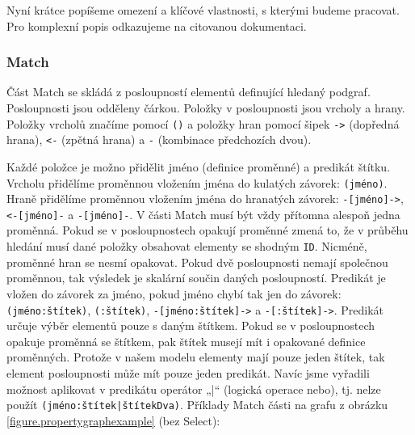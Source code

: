 Nyní krátce popíšeme omezení a klíčové vlastnosti, s kterými budeme pracovat.
Pro komplexní popis odkazujeme na citovanou dokumentaci.

\subsubsection{Match}

Část Match se skládá z posloupností elementů definující hledaný podgraf.
Posloupnosti jsou odděleny čárkou.
Položky v posloupnosti jsou vrcholy a hrany.
Položky vrcholů značíme pomocí \texttt{()} a položky hran pomocí šipek \texttt{->} (dopředná hrana), \texttt{<-} (zpětná hrana) a \texttt{-} (kombinace předchozích dvou).

Každé položce je možno přidělit jméno (definice proměnné) a predikát štítku.
Vrcholu přidělíme proměnnou vložením jména do kulatých závorek: \texttt{(jméno)}.
Hraně přidělíme proměnnou vložením jména do hranatých závorek: \texttt{-[jméno]->}, \texttt{<-[jméno]-} a \texttt{-[jméno]-}.
V části Match musí být vždy přítomna alespoň jedna proměnná.
Pokud se v posloupnostech opakují proměnné zmená to, že v průběhu hledání musí dané položky obsahovat elementy se shodným \texttt{ID}.
Nicméně, proměnné hran se nesmí opakovat.
Pokud dvě posloupnosti nemají společnou proměnnou, tak výsledek je skalární součin daných posloupností. 
Predikát je vložen do závorek za jméno, pokud jméno chybí tak jen do závorek: \texttt{(jméno:štítek)}, \texttt{(:štítek)}, \texttt{-[jméno:štítek]->} a \texttt{-[:štítek]->}.
Predikát určuje výběr elementů pouze s daným štítkem.
Pokud se v posloupnostech opakuje proměnná se štítkem, pak štítek musejí mít i opakované definice proměnných.
Protože v našem modelu elementy mají pouze jeden štítek, tak element posloupnosti může mít pouze jeden predikát.
Navíc jsme vyřadili možnost aplikovat v predikátu operátor „|“ (logická operace nebo), tj. nelze použít \texttt{(jméno:štítek|štítekDva)}.
Příklady Match části na grafu z obrázku \ref{figure.propertygraphexample} (bez Select):

